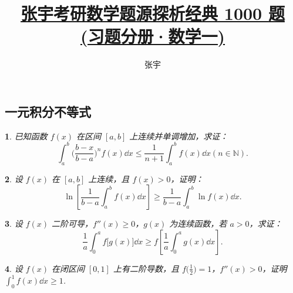 \documentclass[openany,twocolumn]{ctexbook}
\title{\href{https://github.com/sikouhjw/zhangyu1000}{张宇考研数学题源探析经典 1000 题\\(习题分册·数学一)}}
\author{张宇}
\theoremstyle{change}
\newtheorem{ti}{}[section]
\def\leq{\leqslant}
\def\geq{\geqslant}
\begin{document}
	
	\subsection{一元积分不等式}

	\begin{ti}
		已知函数 $f(x)$ 在区间 $[a,b]$ 上连续并单调增加，求证：
		\[
			\int_{a}^{b} \Biggl( \frac{b - x}{b - a} \Biggr)^{n} f(x) \dd{x} \leq \frac{1}{n + 1} \int_{a}^{b} f(x) \dd{x} (n \in \mathbb N).
		\]
	\end{ti}

	\begin{ti}
		设 $f(x)$ 在 $[a,b]$ 上连续，且 $f(x) > 0$，证明：
		\[
			\ln \left[ \frac{1}{b - a} \int_{a}^{b} f(x) \dd{x} \right] \geq \frac{1}{b - a} \int_{a}^{b} \ln f(x) \dd{x}.
		\]
	\end{ti}

	\begin{ti}
		设 $f(x)$ 二阶可导，$f''(x) \geq 0$，$g(x)$ 为连续函数，若 $a > 0$，求证：
		\[
			\frac{1}{a} \int_{0}^{a} f\bigl[g(x)\bigr] \dd{x} \geq f\left[ \frac{1}{a} \int_{0}^{a} g(x) \dd{x} \right].
		\]
	\end{ti}

	\begin{ti}
		设 $f(x)$ 在闭区间 $[0,1]$ 上有二阶导数，且 $f\bigl( \frac{1}{2} \bigr) = 1$，$f''(x) > 0$，证明 $\int_{0}^{1} f(x) \dd{x} \geq 1$.
	\end{ti}
\end{document}

